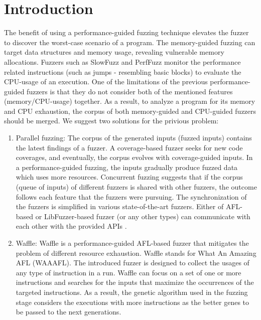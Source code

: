\section{Introduction}

The benefit of using a performance-guided fuzzing technique elevates the fuzzer to discover the worst-case scenario of a program. The memory-guided fuzzing can target data structures and memory usage, revealing vulnerable memory allocations. Fuzzers such as SlowFuzz and PerfFuzz monitor the performance related instructions (such as jumps - resembling basic blocks) to evaluate the CPU-usage of an execution. One of the limitations of the previous performance-guided fuzzers is that they do not consider both of the mentioned features (memory/CPU-usage) together. As a result, to analyze a program for its memory and CPU exhaustion, the corpus of both memory-guided and CPU-guided fuzzers should be merged. We suggest two solutions for the privious problem:

\begin{enumerate}
    \item Parallel fuzzing: The corpus of the generated inputs (fuzzed inputs) contains the latest findings of a fuzzer. A coverage-based fuzzer seeks for new code coverages, and eventually, the corpus evolves with coverage-guided inputs. In a performance-guided fuzzing, the inputs gradually produce fuzzed data which uses more resources. Concurrent fuzzing suggests that if the corpus (queue of inputs) of different fuzzers is shared with other fuzzers, the outcome follows each feature that the fuzzers were pursuing. The synchronization of the fuzzers is simplified in various state-of-the-art fuzzers. Either of AFL-based or LibFuzzer-based fuzzer (or any other types) can communicate with each other with the provided APIs \cite{afl_par}.
    
    \item Waffle: Waffle is a performance-guided AFL-based fuzzer that mitigates the problem of different resource exhaustion. Waffle stands for What An Amazing AFL (WAAAFL). The introduced fuzzer is designed to collect the usages of any type of instruction in a run. Waffle can focus on a set of one or more instructions and searches for the inputs that maximize the occurrences of the targeted instructions. As a result, the genetic algorithm used in the fuzzing stage considers the executions with more instructions as the better genes to be passed to the next generations.
\end{enumerate}



